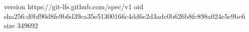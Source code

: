 version https://git-lfs.github.com/spec/v1
oid sha256:d0bf90d8fe9b6d39ca35e51300166c4dd6e2d3adc0b626b8fc898a024e5c9bc6
size 349692
